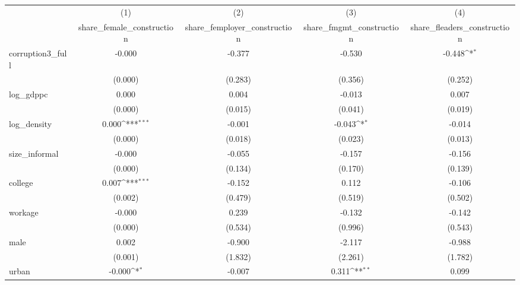 {
\def\sym#1{\ifmmode^{#1}\else\(^{#1}\)\fi}
\begin{tabular}{l*{4}{c}}
\hline\hline
            &\multicolumn{1}{c}{(1)}&\multicolumn{1}{c}{(2)}&\multicolumn{1}{c}{(3)}&\multicolumn{1}{c}{(4)}\\
            &\multicolumn{1}{c}{share\_female\_construction}&\multicolumn{1}{c}{share\_femployer\_construction}&\multicolumn{1}{c}{share\_fmgmt\_construction}&\multicolumn{1}{c}{share\_fleaders\_construction}\\
\hline
corruption3\_full&      -0.000         &      -0.377         &      -0.530         &      -0.448\sym{*}  \\
            &     (0.000)         &     (0.283)         &     (0.356)         &     (0.252)         \\
[1em]
log\_gdppc   &       0.000         &       0.004         &      -0.013         &       0.007         \\
            &     (0.000)         &     (0.015)         &     (0.041)         &     (0.019)         \\
[1em]
log\_density &       0.000\sym{***}&      -0.001         &      -0.043\sym{*}  &      -0.014         \\
            &     (0.000)         &     (0.018)         &     (0.023)         &     (0.013)         \\
[1em]
size\_informal&      -0.000         &      -0.055         &      -0.157         &      -0.156         \\
            &     (0.000)         &     (0.134)         &     (0.170)         &     (0.139)         \\
[1em]
college     &       0.007\sym{***}&      -0.152         &       0.112         &      -0.106         \\
            &     (0.002)         &     (0.479)         &     (0.519)         &     (0.502)         \\
[1em]
workage     &      -0.000         &       0.239         &      -0.132         &      -0.142         \\
            &     (0.000)         &     (0.534)         &     (0.996)         &     (0.543)         \\
[1em]
male        &       0.002         &      -0.900         &      -2.117         &      -0.988         \\
            &     (0.001)         &     (1.832)         &     (2.261)         &     (1.782)         \\
[1em]
urban       &      -0.000\sym{*}  &      -0.007         &       0.311\sym{**} &       0.099         \\

\end{tabular}}
